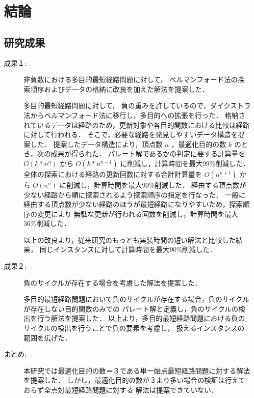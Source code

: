 \documentclass[12pt]{optlab-bachelor}
\begin{document}
\chapter{結論}

\section{研究成果}

\begin{description}
  \item[成果１:]
  非負数における多目的最短経路問題に対して，
  ベルマンフォード法の探索順序およびデータの格納に改良を加えた解法を提案した．

  多目的最短経路問題に対して，
  負の重みを許しているので，ダイクストラ法からベルマンフォード法に移行し，多目的への拡張を行った．
  格納されているデータは経路のため，更新対象や各目的関数における比較は経路に対して行われる．
  そこで，必要な経路を発見しやすいデータ構造を提案した．
  提案したデータ構造により，頂点数 $n$ ，最適化目的の数 $k$ のとき，次の成果が得られた．
  パレート解であるかの判定に要する計算量を $O(k*n^n)$ から $O(k*n^{n-1})$ に削減し，計算時間を最大99\%削減した．
  全体の探索における経路の更新回数に対する合計計算量を $O(n^{n+1})$ から $O(n^n)$ に削減し，計算時間を最大90\%削減した．
  経由する頂点数が少ない経路から順に探索されるよう探索順序の指定を行なった．
  一般に経由する頂点数が少ない経路のほうが最短経路になりやすいため，探索順序の変更により
  無駄な更新が行われる回数を削減し，計算時間を最大 36\%削減した．

  以上の改良より，従来研究のもっとも実装時間の短い解法と比較した結果，
  同じインスタンスに対して計算時間を最大90\%削減した．
\end{description}

\begin{description}
  \item[成果２:]
  負のサイクルが存在する場合を考慮した解法を提案した．

  多目的最短経路問題において負のサイクルが存在する場合，負のサイクルが存在しない目的関数のみでの
  パレート解と定義し，負のサイクルの検出を行う解法を提案した．
  以上より，多目的最短経路問題における負のサイクルの検出を行うことで負の要素を考慮し，
  扱えるインスタンスの範囲を広げた．
\end{description}

\begin{description}
  \item[まとめ:]
  本研究では最適化目的の数＝３である単一始点最短経路問題に対する解法を提案した．
  しかし，最適化目的の数が３より多い場合の検証は行えておらず全点対最短経路問題に対する
  解法は提案できていない．
\end{description}
\end{document}
